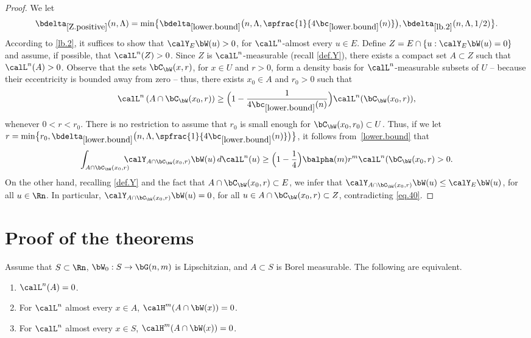 \begin{proof}
We let
\begin{equation*}
\bdelta_{\ref{Z.positive}}(n,\Lambda) = \min \bigl\{\bdelta_{\ref{lower.bound}}\bigl(n,\Lambda,\spfrac{1}{4\bc_{\ref{lower.bound}}(n)}\bigr), \bdelta_{\ref{lb.2}}(n,\Lambda,1/2) \bigr\}.
\end{equation*}
According to \ref{lb.2}, it suffices to show that $\calY_E \bW (u) > 0$, for $\calL^n$-almost every $u \in E$.
Define $Z = E \cap \{ u: \calY_E \bW(u) = 0 \}$ and assume, if possible, that $\calL^n(Z) > 0$.
Since $Z$ is $\calL^n$-measurable (recall \ref{def.Y}), there exists a compact set $A \subset Z$ such that $\calL^n(A) > 0$.
Observe that the sets $\bC_\bW(x,r)$, for $x \in U$ and $r > 0$, form a density basis for $\calL^n$-measurable subsets of $U$ -- because their eccentricity is bounded away from zero -- thus, there exists $x_0 \in A$ and $r_0 > 0$ such that
\begin{equation*}
\calL^n \left(A \cap \bC_\bW(x_0,r) \right) \geq \Bigl(1 - \frac{1}{4\bc_{\ref{lower.bound}}(n)} \Bigr) \calL^n(\bC_\bW(x_0,r)),
\end{equation*}
whenever $0 < r < r_0$.
There is no restriction to assume that $r_0$ is small enough for $\bC_\bW(x_0,r_0) \subset U$.
Thus, if we let $r= \min \bigl\{ r_0, \bdelta_{\ref{lower.bound}}\bigl(n,\Lambda,\spfrac{1}{4\bc_{\ref{lower.bound}}(n)}\bigr) \bigr\}$, it follows from~\ref{lower.bound} that
\begin{equation}
\label{eq.40}
\int_{A \cap \bC_\bW(x_0,r)}\hspace*{-3mm} \calY_{A \cap \bC_\bW(x_0,r)} \bW (u) \,d\calL^n(u) \geq \Bigl(1 - \frac{1}{4}\Bigr) \balpha(m)r^m\calL^n (\bC_\bW(x_0,r) > 0.
\end{equation}
On the other hand, recalling \ref{def.Y} and the fact that $A \cap \bC_\bW(x_0,r) \subset E$, we infer that $\calY_{A \cap \bC_\bW(x_0,r)} \bW(u) \leq \calY_E\bW(u)$, for all $u \in \Rn$.
In particular, $\calY_{A \cap \bC_\bW(x_0,r)} \bW(u)=0$, for all $u \in A \cap \bC_\bW(x_0,r) \subset Z$, contradicting \eqref{eq.40}.
\end{proof}

\section{Proof of the theorems}

\begin{theorem}
Assume that $S \subset \Rn$, $\bW_0: S \to \bG(n,m)$ is Lipschitzian, and $A \subset S$ is Borel measurable. The following are equivalent.
\begin{enumerate}
\item\label{enum:3.1} $\calL^n(A)=0$.
\item\label{enum:3.2} For $\calL^n$ almost every $x \in A$, $\calH^m(A \cap \bW(x))=0$.
\item\label{enum:3.3} For $\calL^n$ almost every $x \in S$, $\calH^m(A \cap \bW(x))=0$.
\end{enumerate}
\end{theorem}

